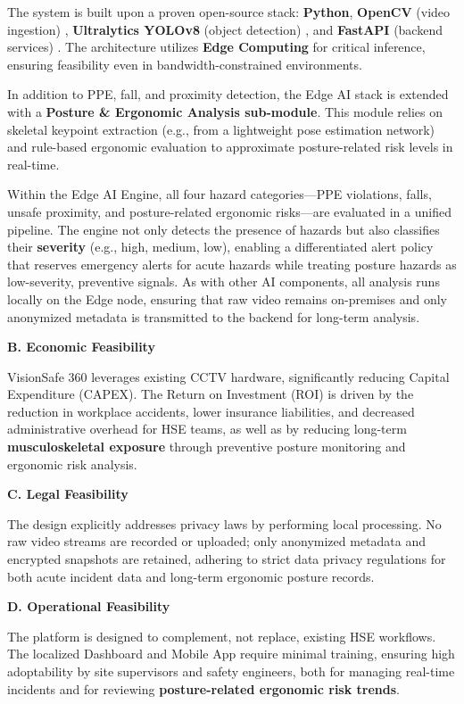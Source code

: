 The system is built upon a proven open-source stack: \textbf{Python}, \textbf{OpenCV} (video ingestion) \cite{bradski2000opencv}, \textbf{Ultralytics YOLOv8} (object detection) \cite{ultralytics_yolov8}, and \textbf{FastAPI} (backend services) \cite{fastapi_docs}. The architecture utilizes \textbf{Edge Computing} for critical inference, ensuring feasibility even in bandwidth-constrained environments.

In addition to PPE, fall, and proximity detection, the Edge AI stack is extended with a \textbf{Posture \& Ergonomic Analysis sub-module}. This module relies on skeletal keypoint extraction (e.g., from a lightweight pose estimation network) and rule-based ergonomic evaluation to approximate posture-related risk levels in real-time.

Within the Edge AI Engine, all four hazard categories—PPE violations, falls, unsafe proximity, and posture-related ergonomic risks—are evaluated in a unified pipeline. The engine not only detects the presence of hazards but also classifies their \textbf{severity} (e.g., high, medium, low), enabling a differentiated alert policy that reserves emergency alerts for acute hazards while treating posture hazards as low-severity, preventive signals. As with other AI components, all analysis runs locally on the Edge node, ensuring that raw video remains on-premises and only anonymized metadata is transmitted to the backend for long-term analysis.

\textbf{B. Economic Feasibility}

VisionSafe 360 leverages existing CCTV hardware, significantly reducing Capital Expenditure (CAPEX). The Return on Investment (ROI) is driven by the reduction in workplace accidents, lower insurance liabilities, and decreased administrative overhead for HSE teams, as well as by reducing long-term \textbf{musculoskeletal exposure} through preventive posture monitoring and ergonomic risk analysis.

\textbf{C. Legal Feasibility}

The design explicitly addresses privacy laws by performing local processing. No raw video streams are recorded or uploaded; only anonymized metadata and encrypted snapshots are retained, adhering to strict data privacy regulations for both acute incident data and long-term ergonomic posture records.

\textbf{D. Operational Feasibility}

The platform is designed to complement, not replace, existing HSE workflows. The localized Dashboard and Mobile App require minimal training, ensuring high adoptability by site supervisors and safety engineers, both for managing real-time incidents and for reviewing \textbf{posture-related ergonomic risk trends}.

